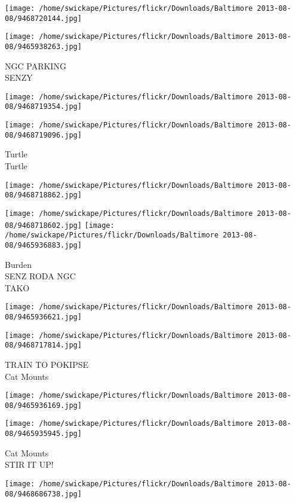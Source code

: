 \documentclass[10pt,letterpaper]{article}
\begin{document}
\texttt{[image: /home/swickape/Pictures/flickr/Downloads/Baltimore 2013-08-08/9468720144.jpg]}

\vspace{0.25in}
\texttt{[image: /home/swickape/Pictures/flickr/Downloads/Baltimore 2013-08-08/9465938263.jpg]}

NGC PARKING\\
SENZY
\pagebreak

\texttt{[image: /home/swickape/Pictures/flickr/Downloads/Baltimore 2013-08-08/9468719354.jpg]}

\vspace{0.25in}
\texttt{[image: /home/swickape/Pictures/flickr/Downloads/Baltimore 2013-08-08/9468719096.jpg]}

Turtle\\
Turtle
\pagebreak

\texttt{[image: /home/swickape/Pictures/flickr/Downloads/Baltimore 2013-08-08/9468718862.jpg]}

\vspace{0.25in}
\texttt{[image: /home/swickape/Pictures/flickr/Downloads/Baltimore 2013-08-08/9468718602.jpg]}
\texttt{[image: /home/swickape/Pictures/flickr/Downloads/Baltimore 2013-08-08/9465936883.jpg]}

Burden\\
SENZ RODA NGC\\
TAKO
\pagebreak

\texttt{[image: /home/swickape/Pictures/flickr/Downloads/Baltimore 2013-08-08/9465936621.jpg]}

\vspace{0.25in}
\texttt{[image: /home/swickape/Pictures/flickr/Downloads/Baltimore 2013-08-08/9468717814.jpg]}

TRAIN TO POKIPSE\\
Cat Mounts
\pagebreak

\texttt{[image: /home/swickape/Pictures/flickr/Downloads/Baltimore 2013-08-08/9465936169.jpg]}

\vspace{0.25in}
\texttt{[image: /home/swickape/Pictures/flickr/Downloads/Baltimore 2013-08-08/9465935945.jpg]}

Cat Mounts\\
STIR IT UP!
\pagebreak

\texttt{[image: /home/swickape/Pictures/flickr/Downloads/Baltimore 2013-08-08/9468686738.jpg]}
\end{document}
